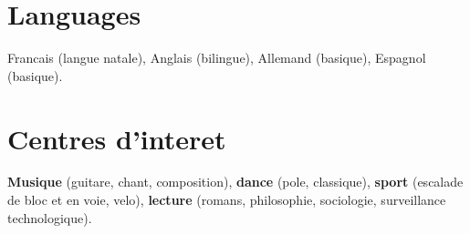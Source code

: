 \documentclass[11pt,a4paper,sans,colorlinks,linkcolor=blue]{moderncv} %
\renewcommand*{\cvitem}[3][.25em]{%
  \ifthenelse{\equal{#2}{}}{}{\hintstyle{#2} }{#3}%
\par\addvspace{#1}}
\begin{document}

\section{Languages}
Francais (langue natale), Anglais (bilingue), Allemand (basique), Espagnol (basique).


\section{Centres d'interet}
\textbf{Musique} (guitare, chant, composition),
\textbf{dance} (pole, classique),
\textbf{sport} (escalade de bloc et en voie, velo),
\textbf{lecture} (romans, philosophie, sociologie, surveillance technologique).

\end{document}
